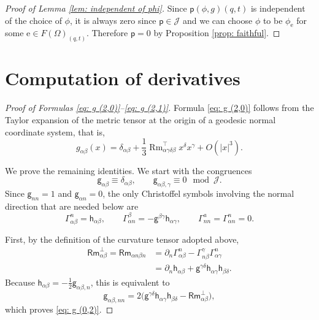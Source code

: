 \documentclass[11pt]{amsart}
\newcommand{\Rm}{\operatorname{Rm}}
\theoremstyle{definition}
\numberwithin{equation}{section}
\begin{document}
\begin{proof}[Proof of Lemma \ref{lem: independent of phi}]
    Since $\mathsf p(\phi,g)(q,t)$ is independent of the choice of $\phi$, it is always zero since $\mathsf p\in\mathcal J$ and we can choose $\phi$ to be $\phi_\mathrm e$ for some $\mathrm e\in F(\Omega)_{(q,t)}$. Therefore $\mathsf p = 0$ by Proposition \ref{prop: faithful}.
\end{proof}

\section{Computation of derivatives}
\label{apd: computation}

\begin{proof}[Proof of Formulas \eqref{eq: g (2,0)}--\eqref{eq: g (2,1)}]
    Formula \eqref{eq: g (2,0)} follows from the Taylor expansion of the metric tensor at the origin of a geodesic normal coordinate system, that is, 
    \[g_{\alpha\beta}(x) = \delta_{\alpha\beta} + \frac{1}{3}\Rm_{\alpha\gamma\delta\beta}^\top x^\delta x^\gamma + O(|x|^3).\] 

    We prove the remaining identities.  
    We start with the congruences
    \[
        \mathsf g_{\alpha\beta}\equiv\delta_{\alpha\beta},
        \qquad \mathsf g_{\alpha\beta,\gamma}\equiv0\mod\mathcal J.
    \]
    Since $\mathsf g_{nn}=1$ and $\mathsf g_{\alpha n}=0$, the only Christoffel symbols involving the normal direction that are needed below are
    \[
        \mathsf \Gamma_{\alpha\beta}^{n} = \mathsf h_{\alpha\beta},
        \qquad
        \mathsf \Gamma_{\alpha n}^{\beta} = -\mathsf g^{\beta\gamma}\mathsf h_{\alpha\gamma},
        \qquad
        \mathsf \Gamma_{nn}^{a} = \mathsf \Gamma_{\alpha n}^{n}=0.
    \]

    First, by the definition of the curvature tensor adopted above,
    \begin{align*}
        \mathsf{Rm}^\bot_{\alpha\beta}
        =\mathsf{Rm}_{\alpha n\beta n}
        &=\partial_n\mathsf\Gamma_{\alpha\beta}^{n}
          -\mathsf\Gamma_{n\beta}^{\gamma}\mathsf\Gamma_{\alpha\gamma}^{n}\\
        &=\partial_n\mathsf h_{\alpha\beta}
          +\mathsf g^{\gamma\delta}\mathsf h_{\alpha\gamma}\mathsf h_{\beta\delta}.
    \end{align*}
    Because $\mathsf h_{\alpha\beta}=-\frac12 \mathsf g_{\alpha\beta,n}$, this is equivalent to
    \[
        \mathsf g_{\alpha\beta,nn}
        =2\bigl(\mathsf g^{\gamma\delta}\mathsf h_{\alpha\gamma}\mathsf h_{\beta\delta}
        -\mathsf{Rm}^\bot_{\alpha\beta}\bigr),
    \]
    which proves \eqref{eq: g (0,2)}.


\end{proof}
\end{document}
